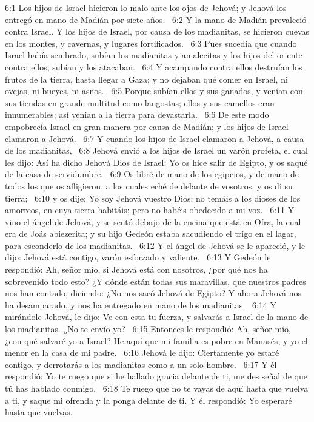 6:1 Los hijos de Israel hicieron lo malo ante los ojos de Jehová; y Jehová los entregó en mano de Madián por siete años.  
6:2 Y la mano de Madián prevaleció contra Israel. Y los hijos de Israel, por causa de los madianitas, se hicieron cuevas en los montes, y cavernas, y lugares fortificados.  
6:3 Pues sucedía que cuando Israel había sembrado, subían los madianitas y amalecitas y los hijos del oriente contra ellos; subían y los atacaban.  
6:4 Y acampando contra ellos destruían los frutos de la tierra, hasta llegar a Gaza; y no dejaban qué comer en Israel, ni ovejas, ni bueyes, ni asnos.  
6:5 Porque subían ellos y sus ganados, y venían con sus tiendas en grande multitud como langostas; ellos y sus camellos eran innumerables; así venían a la tierra para devastarla.  
6:6 De este modo empobrecía Israel en gran manera por causa de Madián; y los hijos de Israel clamaron a Jehová.  
6:7 Y cuando los hijos de Israel clamaron a Jehová, a causa de los madianitas,  
6:8 Jehová envió a los hijos de Israel un varón profeta, el cual les dijo: Así ha dicho Jehová Dios de Israel: Yo os hice salir de Egipto, y os saqué de la casa de servidumbre.  
6:9 Os libré de mano de los egipcios, y de mano de todos los que os afligieron, a los cuales eché de delante de vosotros, y os di su tierra;  
6:10 y os dije: Yo soy Jehová vuestro Dios; no temáis a los dioses de los amorreos, en cuya tierra habitáis; pero no habéis obedecido a mi voz.  
6:11 Y vino el ángel de Jehová, y se sentó debajo de la encina que está en Ofra, la cual era de Joás abiezerita; y su hijo Gedeón estaba sacudiendo el trigo en el lagar, para esconderlo de los madianitas.  
6:12 Y el ángel de Jehová se le apareció, y le dijo: Jehová está contigo, varón esforzado y valiente.  
6:13 Y Gedeón le respondió: Ah, señor mío, si Jehová está con nosotros, ¿por qué nos ha sobrevenido todo esto? ¿Y dónde están todas sus maravillas, que nuestros padres nos han contado, diciendo: ¿No nos sacó Jehová de Egipto? Y ahora Jehová nos ha desamparado, y nos ha entregado en mano de los madianitas.  
6:14 Y mirándole Jehová, le dijo: Ve con esta tu fuerza, y salvarás a Israel de la mano de los madianitas. ¿No te envío yo?  
6:15 Entonces le respondió: Ah, señor mío, ¿con qué salvaré yo a Israel? He aquí que mi familia es pobre en Manasés, y yo el menor en la casa de mi padre.  
6:16 Jehová le dijo: Ciertamente yo estaré contigo, y derrotarás a los madianitas como a un solo hombre.  
6:17 Y él respondió: Yo te ruego que si he hallado gracia delante de ti, me des señal de que tú has hablado conmigo.  
6:18 Te ruego que no te vayas de aquí hasta que vuelva a ti, y saque mi ofrenda y la ponga delante de ti. Y él respondió: Yo esperaré hasta que vuelvas.  
